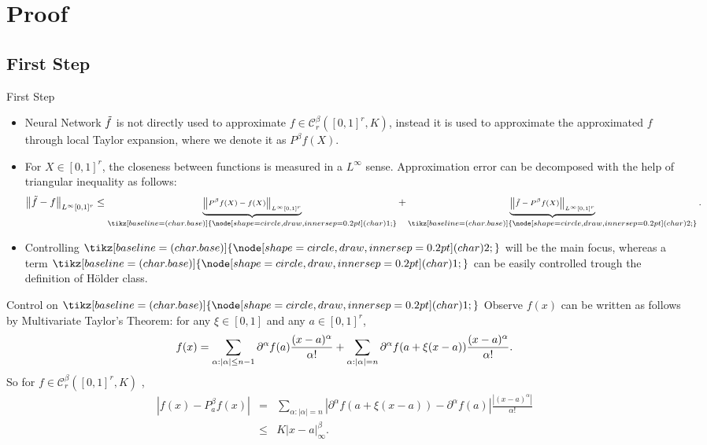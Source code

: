 \documentclass{if-beamer}
\newcommand*\circled[1]{\tikz[baseline=(char.base)]{
            \node[shape=circle,draw,inner sep=0.2pt] (char) {#1};}}
\begin{document}
\section{Proof}
\subsection{First Step}
\begin{frame}{First Step}
    \begin{itemize}
    \item Neural Network $\Tilde{f}$ is not directly used to approximate $f\in\mathcal{C}^{\beta}_{r}([0,1]^{r},K)$, instead it is used to approximate the approximated $f$ through local Taylor expansion, where we denote it as $P^{\beta}f(X)$.
    \item For $X\in[0,1]^{r}$, the closeness between functions is measured in a $L^{\infty}$ sense. Approximation error can be decomposed with the help of triangular inequality as follows:
    \begin{eqnarray*}
        \scriptsize
        \left\| \Tilde{f} - f \right\|_{L^\infty[0,1]^{r}}
        \leq \underbrace{\left\| P^{\beta}f(X) - f(X) \right\|_{L^\infty[0,1]^{r}}}_{\circled{1}} + 
        \underbrace{\left\| \Tilde{f} - P^{\beta}f(X) \right\|_{L^\infty[0,1]^{r}}}_{\circled{2}} .
    \end{eqnarray*}
    
    \item Controlling $\circled{2}$ will be the main focus, whereas a term $\circled{1}$ can be easily controlled trough the definition of H\"older class. 
    \end{itemize}
\end{frame}

\begin{frame}{Control on $\circled{1}$}
    Observe $f(x)$ can be written as follows by Multivariate Taylor's Theorem: for any $\xi \in [0,1]$ and any $a \in [0,1]^{r}$,
    \begin{equation*}
        \tiny
        f(x)=\sum_{\alpha:|\alpha|\leq n-1}\partial^{\alpha}f(a)\frac{(x-a)^{\alpha}}{\alpha!}+
        \sum_{\alpha:|\alpha|=n}\partial^{\alpha}f(a+\xi(x-a))\frac{(x-a)^{\alpha}}{\alpha!}.
     \end{equation*}
    So for $f\in\mathcal{C}^{\beta}_{r}([0,1]^{r},K)$ ,
    \begin{eqnarray*}
        |f(x)-P^{\beta}_{a}f(x)| &=& \sum_{\alpha:|\alpha|=n}\left|\partial^{\alpha}f(a+\xi(x-a))-\partial^{\alpha}f(a)\right|\frac{\left|(x-a)^{\alpha}\right|}{\alpha!} \\
        &\leq& K|x-a|_{\infty}^{\beta}.
    \end{eqnarray*}
\end{frame}
\end{document}
